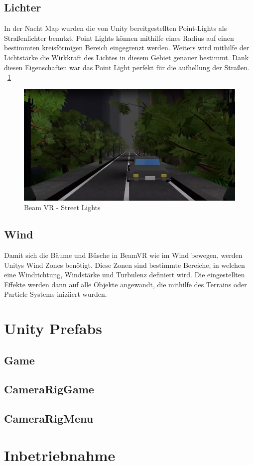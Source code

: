 \subsection{Lichter}\label{subsec:light-effect}
In der Nacht Map wurden die von Unity bereitgestellten Point-Lights als Straßenlichter benutzt.
Point Lights k\"onnen mithilfe eines Radius auf einen bestimmten kreisf\"ormigen Bereich eingegrenzt werden.
Weiters wird mithilfe der Lichtst\"arke die Wirkkraft des Lichtes in diesem Gebiet genauer bestimmt.
Dank diesen Eigenschaften war das Point Light perfekt f\"ur die aufhellung der Straßen.
~\ref{fig:beamvr_street_lights}
~\cite{Unity_PointLights_2022}
\begin {figure}
    \centering
    \includegraphics[scale=0.3]{pics/beamvr_point_lights}
    \caption{Beam VR - Street Lights}
    \label{fig:beamvr_street_lights}
\end {figure}


\subsection{Wind}\label{subsec:wind-effect}
Damit sich die B\"aume und B\"usche in BeamVR wie im Wind bewegen, werden Unitys Wind Zones ben\"otigt.
Diese Zonen sind bestimmte Bereiche, in welchen eine Windrichtung, Windst\"arke und Turbulenz definiert wird.
Die eingestellten Effekte werden dann auf alle Objekte angewandt, die mithilfe des Terrains oder Particle Systems iniziiert wurden.
~\cite{Unity_WindZones_2022}

\section{Unity Prefabs}\label{sec:prefabs}
\subsection{Game}\label{subsec:game-prefab}
\subsection{CameraRigGame}\label{subsec:camera-rig-game-prefab}
\subsection{CameraRigMenu}\label{subsec:camera-rig-menu-prefab}
\section{Inbetriebnahme}\label{sec:commissioning}
